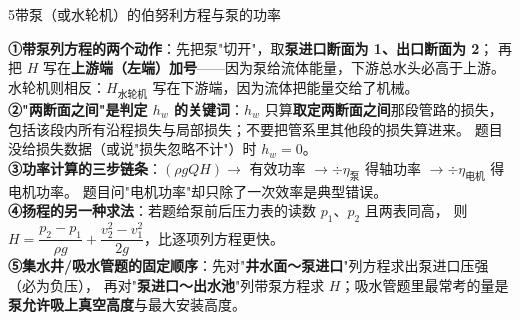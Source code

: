 \begin{kaodian}{5}{带泵（或水轮机）的伯努利方程与泵的功率}
\begin{banfa}
\textbf{①带泵列方程的两个动作}：先把泵"切开"，取\textbf{泵进口断面为 1、出口断面为 2}；
再把 $H$ 写在\textbf{上游端（左端）加号}——因为泵给流体能量，下游总水头必高于上游。
水轮机则相反：$H_{\text{水轮机}}$ 写在下游端，因为流体把能量交给了机械。\\
\textbf{②"两断面之间"是判定 $h_w$ 的关键词}：$h_w$ 只算\textbf{取定两断面之间}那段管路的损失，
包括该段内所有沿程损失与局部损失；不要把管系里其他段的损失算进来。
题目没给损失数据（或说"损失忽略不计"）时 $h_w=0$。\\
\textbf{③功率计算的三步链条}：$(\rho gQH)\to$ 有效功率 $\to\div\eta_{\text{泵}}$ 得轴功率 $\to\div\eta_{\text{电机}}$ 得电机功率。
题目问"电机功率"却只除了一次效率是典型错误。\\
\textbf{④扬程的另一种求法}：若题给泵前后压力表的读数 $p_1$、$p_2$ 且两表同高，
则 $H=\dfrac{p_2-p_1}{\rho g}+\dfrac{v_2^2-v_1^2}{2g}$，比逐项列方程更快。\\
\textbf{⑤集水井/吸水管题的固定顺序}：先对"\textbf{井水面～泵进口}"列方程求出泵进口压强（必为负压），
再对"\textbf{泵进口～出水池}"列带泵方程求 $H$；吸水管题里最常考的量是\textbf{泵允许吸上真空高度}与最大安装高度。
\end{banfa}
\end{kaodian}

